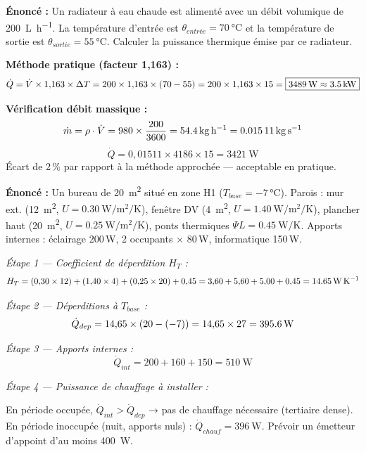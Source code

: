 \begin{exemple}[title=Calcul de puissance d'un radiateur eau chaude]

\textbf{Énoncé :} Un radiateur à eau chaude est alimenté avec un débit volumique de
\SI{200}{\liter\per\hour}. La température d'entrée est $\theta_{entrée} = \SI{70}{\degreeCelsius}$
et la température de sortie est $\theta_{sortie} = \SI{55}{\degreeCelsius}$. Calculer la
puissance thermique émise par ce radiateur.

\textbf{Méthode pratique (facteur 1,163) :}
\[
  \dot{Q} = \dot{V} \times 1{,}163 \times \Delta T = 200 \times 1{,}163 \times (70-55)
  = 200 \times 1{,}163 \times 15 = \boxed{\SI{3489}{\watt} \approx \SI{3{,}5}{\kilo\watt}}
\]

\textbf{Vérification débit massique :}
\[
  \dot{m} = \rho \cdot \dot{V} = 980 \times \frac{200}{3600} = \SI{54{,}4}{\kilogram\per\hour}
  = \SI{0{,}01511}{\kilogram\per\second}
\]
\[
  \dot{Q} = 0{,}01511 \times 4186 \times 15 = \SI{3421}{\watt}
\]
Écart de 2\,\% par rapport à la méthode approchée — acceptable en pratique.
\end{exemple}

\begin{exemple}[title=Bilan thermique d'une pièce de bureau — puissance de chauffage]

\textbf{Énoncé :} Un bureau de \SI{20}{\meter\squared} situé en zone H1 ($T_{base} = -7$\,°C). Parois : mur ext. (\SI{12}{\meter\squared}, $U = \SI{0,30}{\watt\per\meter\squared\per\kelvin}$), fenêtre DV (\SI{4}{\meter\squared}, $U = \SI{1,40}{\watt\per\meter\squared\per\kelvin}$), plancher haut (\SI{20}{\meter\squared}, $U = \SI{0,25}{\watt\per\meter\squared\per\kelvin}$), ponts thermiques $\Psi L = \SI{0,45}{\watt\per\kelvin}$.
Apports internes : éclairage 200\,W, 2 occupants × 80\,W, informatique 150\,W.

\textit{Étape 1 — Coefficient de déperdition $H_T$ :}
\[
  H_T = (0{,}30 \times 12) + (1{,}40 \times 4) + (0{,}25 \times 20) + 0{,}45
  = 3{,}60 + 5{,}60 + 5{,}00 + 0{,}45 = \SI{14{,}65}{\watt\per\kelvin}
\]

\textit{Étape 2 — Déperditions à $T_{base}$ :}
\[
  \dot{Q}_{dep} = 14{,}65 \times (20 - (-7)) = 14{,}65 \times 27 = \SI{395{,}6}{\watt}
\]

\textit{Étape 3 — Apports internes :}
\[
  \dot{Q}_{int} = 200 + 160 + 150 = \SI{510}{\watt}
\]

\textit{Étape 4 — Puissance de chauffage à installer :}

En période occupée, $\dot{Q}_{int} > \dot{Q}_{dep}$ → pas de chauffage nécessaire (tertiaire dense).
En période inoccupée (nuit, apports nuls) : $\dot{Q}_{chauf} = \SI{396}{\watt}$. Prévoir un émetteur d'appoint d'au moins \SI{400}{\watt}.
\end{exemple}

